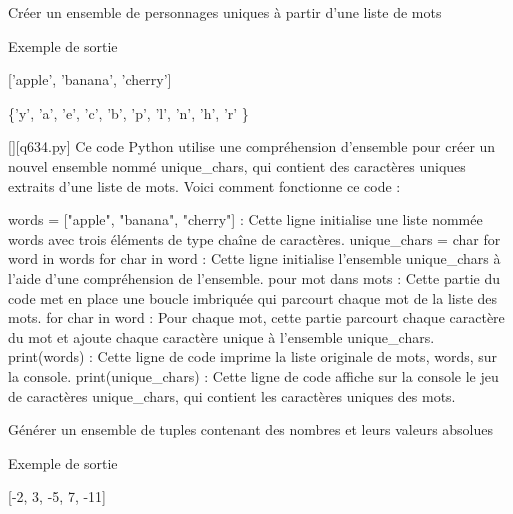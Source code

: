         \question
        Créer un ensemble de personnages uniques à partir d'une liste de mots

Exemple de sortie

['apple', 'banana', 'cherry']

\{'y', 'a', 'e', 'c', 'b', 'p', 'l', 'n', 'h', 'r' \}
        \par
        \begin{solution}
            \renewcommand{\nomfichier}{q634.py}
            \pythonfile{\chemincode \nomfichier}[][\nomfichier]
            Ce code Python utilise une compréhension d'ensemble pour créer un nouvel ensemble nommé unique_chars, qui contient des caractères uniques extraits d'une liste de mots. Voici comment fonctionne ce code :

    words = ["apple", "banana", "cherry"] : Cette ligne initialise une liste nommée words avec trois éléments de type chaîne de caractères.
    unique_chars = {char for word in words for char in word} : Cette ligne initialise l'ensemble unique_chars à l'aide d'une compréhension de l'ensemble.
        pour mot dans mots : Cette partie du code met en place une boucle imbriquée qui parcourt chaque mot de la liste des mots.
        for char in word : Pour chaque mot, cette partie parcourt chaque caractère du mot et ajoute chaque caractère unique à l'ensemble unique_chars.
    print(words) : Cette ligne de code imprime la liste originale de mots, words, sur la console.
    print(unique_chars) : Cette ligne de code affiche sur la console le jeu de caractères unique_chars, qui contient les caractères uniques des mots.
        \end{solution}
        

        \question
        Générer un ensemble de tuples contenant des nombres et leurs valeurs absolues

Exemple de sortie

[-2, 3, -5, 7, -11]

